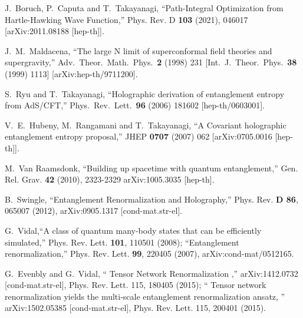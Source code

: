 \documentclass[a4paper,12pt]{article}
\begin{document}
\begin{thebibliography}{}


J.~Boruch, P.~Caputa and T.~Takayanagi,
``Path-Integral Optimization from Hartle-Hawking Wave Function,''
Phys. Rev. D \textbf{103} (2021), 046017
[arXiv:2011.08188 [hep-th]].
  
  J.~M.~Maldacena,
  ``The large N limit of superconformal field theories and supergravity,''
  Adv.\ Theor.\ Math.\ Phys.\  {\bf 2} (1998) 231
  [Int.\ J.\ Theor.\ Phys.\  {\bf 38} (1999) 1113]
  [arXiv:hep-th/9711200].
  
  S.~Ryu and T.~Takayanagi,
  ``Holographic derivation of entanglement entropy from AdS/CFT,'' 
 Phys.\ Rev.\ Lett.\  {\bf 96} (2006) 181602  %
  [hep-th/0603001].  %

  V.~E.~Hubeny, M.~Rangamani and T.~Takayanagi,
``A Covariant holographic entanglement entropy proposal,''  
JHEP {\bf 0707} (2007) 062  
[arXiv:0705.0016 [hep-th]].  %

M.~Van Raamsdonk,
``Building up spacetime with quantum entanglement,''
Gen. Rel. Grav. \textbf{42} (2010), 2323-2329
arXiv:1005.3035 [hep-th].

  B.~Swingle,
  ``Entanglement Renormalization and Holography,''  
 Phys. Rev. {\bf D 86}, 065007 (2012), 
 arXiv:0905.1317 [cond-mat.str-el].  %

G.~Vidal,``A class of quantum many-body states that can be efficiently simulated,''
Phys. Rev. Lett. {\bf 101}, 110501 (2008);%
``Entanglement renormalization,''
Phys. Rev. Lett. {\bf 99}, 220405 (2007), arXiv:cond-mat/0512165.

G.~Evenbly and G.~Vidal, `` Tensor Network Renormalization ,'' arXiv:1412.0732 [cond-mat.str-el],
 Phys. Rev. Lett. 115, 180405 (2015);
`` Tensor network renormalization yields the multi-scale entanglement renormalization ansatz, '' 
arXiv:1502.05385 [cond-mat.str-el],  Phys. Rev. Lett. 115, 200401 (2015).


\end{thebibliography}
\end{document}
